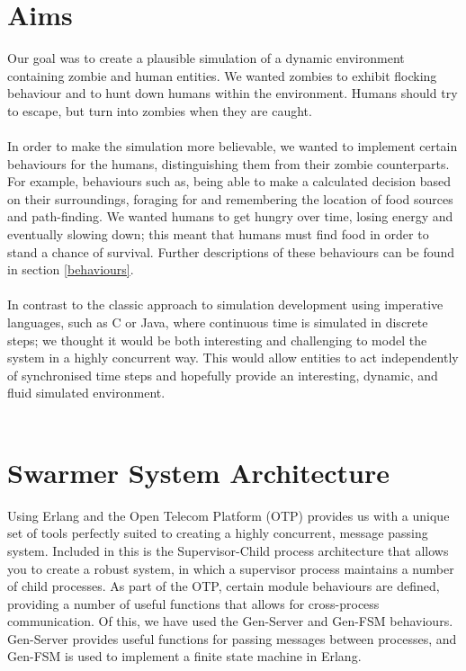 \documentclass[10pt, a4paper, conference, compsocconf]{IEEEtran}
\begin{document}
\section{Aims \label{aims}}
Our goal was to create a plausible simulation of a dynamic environment containing zombie and human entities. We wanted zombies to exhibit flocking behaviour and to hunt down humans within the environment. Humans should try to escape, but turn into zombies when they are caught.\\
\\
In order to make the simulation more believable, we wanted to implement certain behaviours for the humans, distinguishing them from their zombie counterparts. For example, behaviours such as, being able to make a calculated decision based on their surroundings, foraging for and remembering the location of food sources and path-finding. We wanted humans to get hungry over time, losing energy and eventually slowing down; this meant that humans must find food in order to stand a chance of survival. Further descriptions of these behaviours can be found in section \ref{behaviours}.\\
\\
In contrast to the classic approach to simulation development using imperative languages, such as C or Java, where continuous time is simulated in discrete steps; we thought it would be both interesting and challenging to model the system in a highly concurrent way. This would allow entities to act independently of synchronised time steps and hopefully provide an interesting, dynamic, and fluid simulated environment.\\
\\

\section{Swarmer System Architecture \label{architecture}}
Using Erlang and the Open Telecom Platform\cite{otp} (OTP) provides us with a unique set of tools perfectly suited to creating a highly concurrent, message passing system. Included in this is the Supervisor-Child process architecture that allows you to create a robust system, in which a supervisor process maintains a number of child processes. As part of the OTP, certain module behaviours are defined, providing a number of useful functions that allows for cross-process communication. Of this, we have used the Gen-Server\cite{gen_server} and Gen-FSM\cite{gen_fsm} behaviours. Gen-Server provides useful functions for passing messages between processes, and Gen-FSM is used to implement a finite state machine in Erlang.
\end{document}
